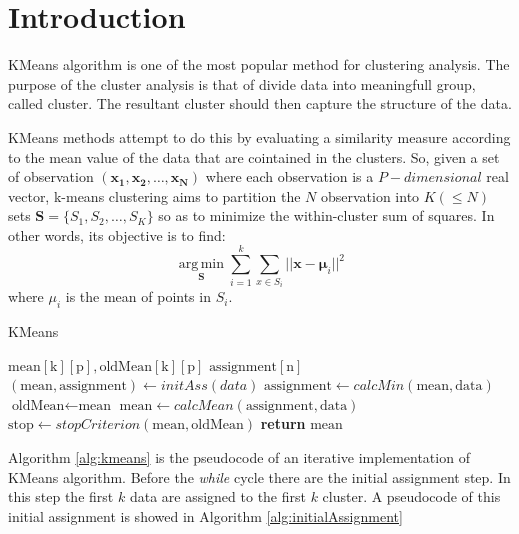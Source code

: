 \documentclass[10pt,twocolumn,letterpaper]{article}
\begin{document}
\section{Introduction}
KMeans algorithm is one of the most popular method for clustering analysis.
The purpose of the cluster analysis is that of divide data into meaningfull group, called cluster.
The resultant cluster should then capture the structure of the data.\par
KMeans methods attempt to do this by evaluating a similarity measure according to the mean value of
the data that are cointained in the clusters.
So, given a set of observation $(\boldsymbol{x_{1}}, \boldsymbol{x_{2}}, \dots,\boldsymbol{x_{N}} )$ where each observation is a $P-dimensional$ real vector, k-means clustering aims to partition the $N$ observation into $K (\leq N)$ sets $\boldsymbol{S} = \{S_{1}, S_{2}, \dots, S_{K}\}$ so as to minimize the within-cluster sum of squares. In other words, its objective is to find: 
\begin{equation}
\label{eq:first}
\operatorname*{arg\, min}_{\boldsymbol{S}} \displaystyle\sum_{i = 1}^{k} \displaystyle\sum_{x \in S_{i}} ||\boldsymbol{x} - \boldsymbol{\mu}_{i} ||^{2}
\end{equation}  
where $\mu_i$ is the mean of points in $S_{i}$.\cite{wiki:kmeans}
\par
\begin{algorithm}
\label{alg:kmeans}
\caption{KMeans}
\begin{algorithmic}[1]
\State $\text{mean}[\text{k}][\text{p}], \text{oldMean}[\text{k}][\text{p}]$
\State $\text{assignment}[\text{n}]$
\State $(\text{mean}, \text{assignment}) \leftarrow initAss(data)$
\State $\text{assignment} \leftarrow calcMin(\text{mean}, \text{data})$
\State $\text{oldMean} \leftarrow \text{mean}$
\State $\text{mean} \leftarrow calcMean(\text{assignment}, \text{data})$
\State $\text{stop} \leftarrow stopCriterion(\text{mean}, \text{oldMean})$
\EndWhile
\State \textbf{return} $\text{mean}$
\EndProcedure
\end{algorithmic}
\end{algorithm}
Algorithm \ref{alg:kmeans} is the pseudocode of an iterative implementation of KMeans algorithm.
Before the \textit{while} cycle there are the initial assignment step. In this step the first $k$ data are assigned to the first $k$ cluster. A pseudocode of this initial assignment is showed in Algorithm \ref{alg:initialAssignment}
\end{document}
